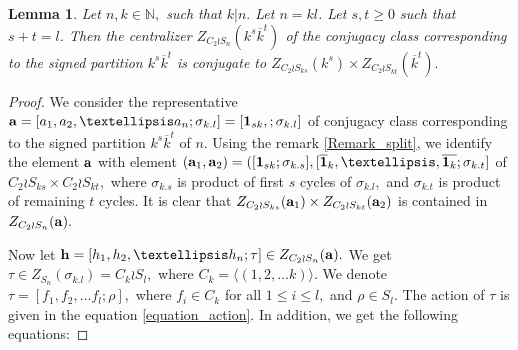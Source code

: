 \documentclass[12pt,twoside,reqno]{amsart}
\newtheorem{lemma}[theorem]{Lemma}
\theoremstyle{definition}
\numberwithin{equation}{section}
\begin{document}
\begin{lemma}\label{Lemma_signed_partition}
Let $n,k \in \mathbb N,$ such that $k|n.$  Let $n = kl$.
Let $s, t\geq 0$ such that $s+t =l$. Then the centralizer $Z_{C_2 \wr S_n}(k^s\overline{k}^t)$ of the conjugacy class corresponding to the signed partition $k^s\overline{k}^t$ is 
conjugate to $Z_{C_2 \wr S_{ks}}(k^s) \times Z_{C_2 \wr S_{kt}}(\overline{k}^t).$
\end{lemma}
\begin{proof}
We consider the representative ${\bf a}=[a_1, a_2, \dots a_n; \sigma_{k.l}]= [{\bf 1}_{sk}, ; \sigma_{k.l}]$ of conjugacy class corresponding to the signed partition $k^s\overline{k}^t$ of $n.$ Using the remark \ref{Remark_split}, we identify the element ${\bf a}$ with element $({\bf a}_1, {\bf a}_2)= ([{\bf 1}_{sk}; \sigma_{k.s}], [\overline{{\bf 1}}_k,\ldots,\overline{{\bf 1}_k}; \sigma_{k.t}]$ of $C_2 \wr S_{ks} \times C_2 \wr S_{kt}, $ where $\sigma_{k.s}$ is product of first $s$ cycles of $\sigma_{k.l},$ and $\sigma_{k.t}$ is product of remaining $t$ cycles. It is clear that $Z_{C_2 \wr S_{ks}}({\bf a}_1) \times Z_{C_2 \wr S_{kt}}({\bf a}_2)$ is contained in $Z_{C_2 \wr S_n}({\bf a}).$

Now let ${\bf h}=[h_1, h_2, \dots h_n ; \tau] \in Z_{C_2 \wr S_n}({\bf a}).$ We get $\tau \in Z_{S_n}(\sigma_{k.l})=C_k \wr S_l,$ where $C_k =\langle (1,2,\dots k)\rangle.$ We denote $\tau =[f_1, f_2, \dots f_l; \rho], $ where $f_i\in C_k$ for all $1\leq i\leq l,$ and $\rho\in S_l.$ The action of $\tau$ is given in the equation  \ref{equation_action}. In addition, we get the following equations:


\end{proof}
\end{document}
